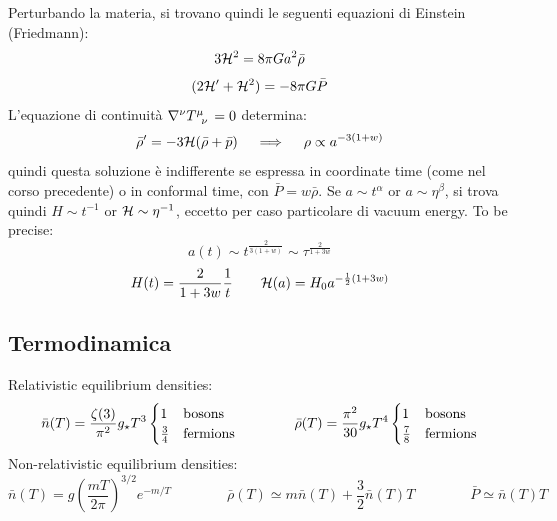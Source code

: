 Perturbando la materia, si trovano quindi le seguenti equazioni di Einstein (Friedmann):
\begin{equation}
  3 \mathcal{H}^2 = 8 \pi G a^2 \bar{\rho}
  \label{eq:f1}
\end{equation}
\begin{equation}
  (2\mathcal{H}' + \mathcal{H}^2) = - 8 \pi G \bar{P}
  \label{eq:f2}
\end{equation}
L'equazione di continuità $ \na^\nu \tensor{T}{^\mu_\nu} = 0 $ determina:
\begin{equation*}
  \bar{\rho}' = - 3 \mathcal{H} (\bar{\rho} + \bar{p})
  \quad \implies \quad
  \rho \propto a^{-3 (1 + w)}
\end{equation*}
quindi questa soluzione è indifferente se espressa in coordinate time (come nel corso precedente) o in conformal time, con $ \bar{P} = w \bar{\rho} $. Se $ a \sim t^\alpha $ or $ a \sim \eta^\beta $, si trova quindi $ H \sim t^{-1} $ or $ \mathcal{H} \sim \eta^{-1} $, eccetto per caso particolare di vacuum energy. To be precise:
\begin{equation*}
  a(t) \sim t^{\frac{2}{3 (1 + w)}} \sim \tau ^{\frac{2}{1 + 3 w}}
\end{equation*}
\begin{equation*}
  H(t) = \frac{2}{1 + 3 w} \frac{1}{t}
  \qquad
  \mathcal{H}(a) = H_0 a^{- \frac{1}{2} (1 + 3 w)}
\end{equation*}

\subsection{Termodinamica}

Relativistic equilibrium densities:
\begin{equation*}
  \bar{n}(T) = \frac{\zeta(3)}{\pi^2} g_\star T^3
  \begin{cases}
    1 & \text{bosons} \\
    \frac{3}{4} & \text{fermions}
  \end{cases}
  \qquad \qquad
  \bar{\rho}(T) = \frac{\pi^2}{30} g_\star T^4
  \begin{cases}
    1 & \text{bosons} \\
    \frac{7}{8} & \text{fermions}
  \end{cases}
\end{equation*}
Non-relativistic equilibrium densities:
\begin{equation*}
  \bar{n}(T) = g \left( \frac{mT}{2\pi} \right)^{3/2} e^{-m/T}
  \qquad \qquad
  \bar{\rho}(T) \simeq m \bar{n}(T) + \frac{3}{2} \bar{n}(T) T
  \qquad \qquad
  \bar{P} \simeq \bar{n}(T) T
\end{equation*}

